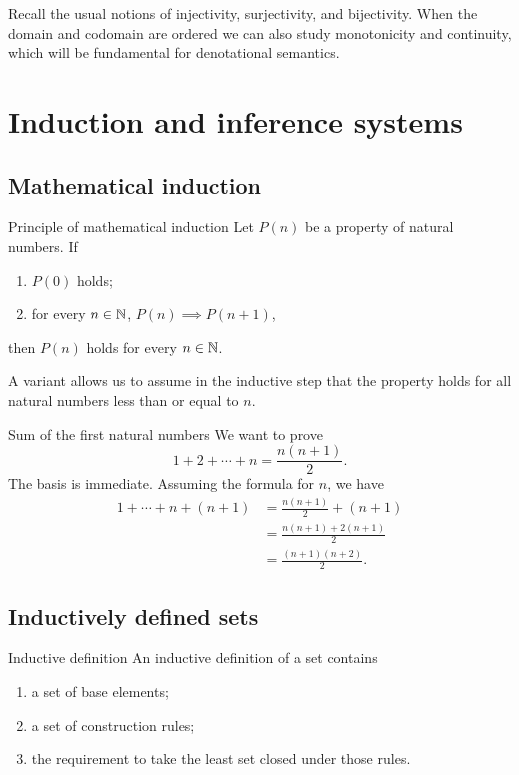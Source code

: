 \documentclass[a4paper]{article}
\begin{document}
Recall the usual notions of injectivity, surjectivity, and bijectivity.
When the domain and codomain are ordered we can also study monotonicity and continuity, which will be fundamental for denotational semantics.

\section{Induction and inference systems}

\subsection{Mathematical induction}

\begin{snippettheorem}{Principle of mathematical induction}
    Let \(P(n)\) be a property of natural numbers.
    If
    \begin{enumerate}
        \item \(P(0)\) holds;
        \item for every \(n\in\mathbb{N}\), \(P(n)\implies P(n+1)\),
    \end{enumerate}
    then \(P(n)\) holds for every \(n\in\mathbb{N}\).
\end{snippettheorem}

A variant allows us to assume in the inductive step that the property holds for all natural numbers less than or equal to \(n\).

\begin{snippetexample}{Sum of the first natural numbers}
    We want to prove
    \[
        1+2+\cdots+n=\frac{n(n+1)}2.
    \]
    The basis is immediate. Assuming the formula for \(n\), we have
    \begin{align*}
        1+\cdots+n+(n+1)
        &=\frac{n(n+1)}2+(n+1)\\
        &=\frac{n(n+1)+2(n+1)}2\\
        &=\frac{(n+1)(n+2)}2.
    \end{align*}
\end{snippetexample}

\subsection{Inductively defined sets}

\begin{snippetdefinition}{Inductive definition}
    An inductive definition of a set contains
    \begin{enumerate}
        \item a set of base elements;
        \item a set of construction rules;
        \item the requirement to take the least set closed under those rules.
    \end{enumerate}
\end{snippetdefinition}
\end{document}

